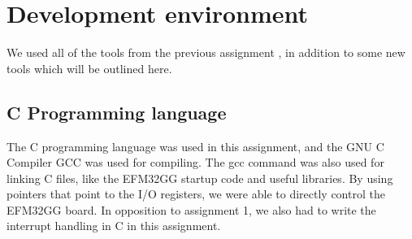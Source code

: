 \section{Development environment}
We used all of the tools from the previous assignment \cite{report-1}, in addition to some new tools which will be outlined here.

\subsection{C Programming language}
The C programming language was used in this assignment, and the GNU C Compiler GCC was used for compiling.
The gcc command was also used for linking C files, like the EFM32GG startup code and useful libraries. By using pointers that point to the I/O registers, we were able to directly control the EFM32GG board. In opposition to assignment 1, we also had to write the interrupt handling in C in this assignment.
